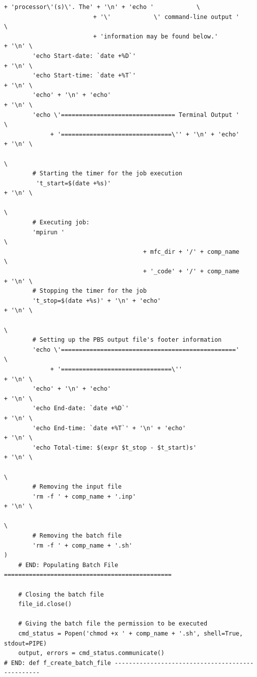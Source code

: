 \documentclass[11pt]{article}
\begin{document}
\begin{lstlisting}[style=BashInputStyle]
                         + 'processor\'(s)\'. The' + '\n' + 'echo '            \
                         + '\'            \' command-line output '             \
                         + 'information may be found below.'            + '\n' \
        'echo Start-date: `date +%D`'                                   + '\n' \
        'echo Start-time: `date +%T`'                                   + '\n' \
        'echo' + '\n' + 'echo'                                          + '\n' \
        'echo \'================================ Terminal Output '             \
             + '===============================\'' + '\n' + 'echo'      + '\n' \
                                                                               \
        # Starting the timer for the job execution
         't_start=$(date +%s)'                                          + '\n' \
                                                                               \
        # Executing job:
        'mpirun '                                                               \
                                       + mfc_dir + '/' + comp_name             \
                                       + '_code' + '/' + comp_name      + '\n' \
        # Stopping the timer for the job
        't_stop=$(date +%s)' + '\n' + 'echo'                            + '\n' \
                                                                               \
        # Setting up the PBS output file's footer information
        'echo \'================================================='             \
             + '===============================\''                      + '\n' \
        'echo' + '\n' + 'echo'                                          + '\n' \
        'echo End-date: `date +%D`'                                     + '\n' \
        'echo End-time: `date +%T`' + '\n' + 'echo'                     + '\n' \
        'echo Total-time: $(expr $t_stop - $t_start)s'                  + '\n' \
                                                                               \
        # Removing the input file
        'rm -f ' + comp_name + '.inp'                                   + '\n' \
                                                                               \
        # Removing the batch file
        'rm -f ' + comp_name + '.sh'                                           )
    # END: Populating Batch File ===============================================
    
    # Closing the batch file
    file_id.close()
    
    # Giving the batch file the permission to be executed
    cmd_status = Popen('chmod +x ' + comp_name + '.sh', shell=True, stdout=PIPE)
    output, errors = cmd_status.communicate()
# END: def f_create_batch_file -------------------------------------------------
\end{lstlisting}
\end{document}
